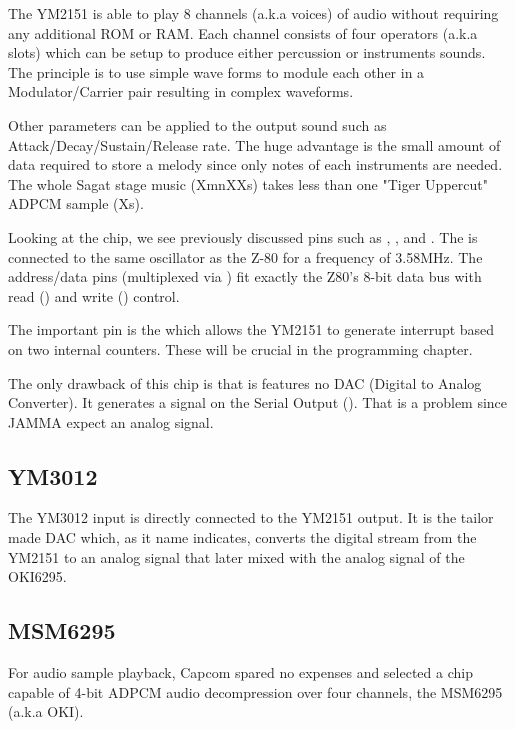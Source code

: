 The YM2151 is able to play 8 channels (a.k.a voices) of audio without requiring any additional ROM or RAM. Each channel consists of four operators (a.k.a slots) which can be setup to produce either percussion or instruments sounds. The principle is to use simple wave forms to module each other in a Modulator/Carrier pair resulting in complex waveforms\cite{fmProgramming}.


Other parameters can be applied to the output sound such as Attack/Decay/Sustain/Release rate. The huge advantage is the small amount of data required to store a melody since only notes of each instruments are needed. The whole Sagat stage music (XmnXXs) takes less than one "Tiger Uppercut" ADPCM sample (Xs).

Looking at the chip, we see previously discussed pins such as , , and . The  is connected to the same oscillator as the Z-80 for a frequency of 3.58MHz. The  address/data pins (multiplexed via ) fit exactly the Z80's 8-bit data bus with read () and write () control.

The important pin is the  which allows the YM2151 to generate interrupt based on two internal counters. These will be crucial in the programming chapter.


The only drawback of this chip is that is features no DAC (Digital to Analog Converter). It generates a signal on the Serial Output (). That is a problem since JAMMA expect an analog signal.

\subsection{YM3012}
The YM3012 input is directly connected to the YM2151 output. It is the tailor made DAC which, as it name indicates, converts the digital stream from the YM2151 to an analog signal that later mixed with the analog signal of the OKI6295.

\subsection{MSM6295}
For audio sample playback, Capcom spared no expenses and selected a chip capable of 4-bit ADPCM audio decompression over four channels, the MSM6295 (a.k.a OKI). 

